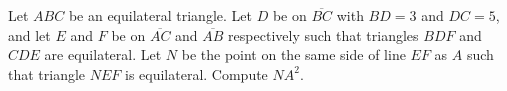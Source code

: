 Let $ABC$ be an equilateral triangle. Let $D$ be on $\overline{BC}$ with $BD=3$ and $DC=5$, and let $E$ and $F$ be on $\overline{AC}$ and $\overline{AB}$ respectively such that triangles $BDF$ and $CDE$ are equilateral. Let $N$ be the point on the same side of line $EF$ as $A$ such that triangle $NEF$ is equilateral. Compute $NA^2$.
